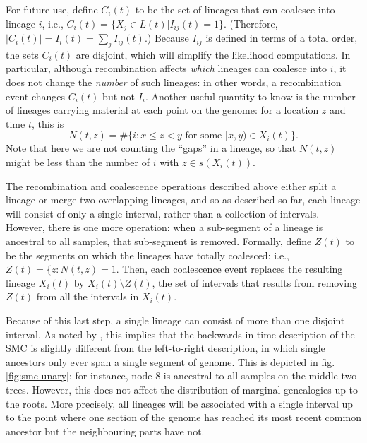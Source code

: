 \documentclass{article}
\begin{document}
For future use, define $C_i(t)$ to be the set of lineages that can coalesce into lineage $i$,
i.e., $C_i(t) = \{X_j \in L(t) | I_{ij}(t) = 1\}$.
(Therefore, $|C_i(t)| = I_{i}(t) = \sum_{j} I_{ij}(t)$.)
Because $I_{ij}$ is defined in terms of a total order, the sets $C_i(t)$ are disjoint,
which will simplify the likelihood computations.
In particular,
although recombination affects \emph{which} lineages can coalesce into $i$,
it does not change the \emph{number} of such lineages:
in other words, a recombination event changes $C_i(t)$ but not $I_{i}$.
Another useful quantity to know is the number of lineages carrying material
at each point on the genome:
for a location $z$ and time $t$, this is
\begin{equation}
    N(t,z) = \#\{i : x \le z < y \text{ for some } [x,y) \in X_i(t) \} .
\end{equation}
Note that here we are not counting the ``gaps'' in a lineage,
so that $N(t, z)$ might be less than the number of $i$ with $z \in s(X_i(t))$.

The recombination and coalescence operations described above
either split a lineage or merge two overlapping lineages,
and so as described so far, each lineage will consist of only a single interval,
rather than a collection of intervals.
However, there is one more operation:
when a sub-segment of a lineage is ancestral to all samples,
that sub-segment is removed.
Formally, define $Z(t)$ to be the segments on which the lineages have totally coalesced:
i.e., $Z(t) = \{z : N(t,z) = 1$.
Then, each coalescence event replaces the resulting lineage $X_i(t)$
by $X_i(t) \setminus Z(t)$,
the set of intervals that results from removing $Z(t)$ from all the intervals in $X_i(t)$.

Because of this last step, a single lineage can consist of more than one disjoint interval.
As noted by \cite{mcvean_approximating_2005},
this implies that the backwards-in-time description of the
SMC is slightly different from the left-to-right description,
in which single ancestors only ever span a single segment of genome.
This is depicted in fig.\ref{fig:smc-unary}:
for instance, node 8 is ancestral to all samples on the middle two trees.
However, this does not affect the distribution
of marginal genealogies up to the roots.
More precisely, all lineages will be associated with
a single interval up to the point where one section of the
genome has reached its most recent common ancestor but the neighbouring parts have not.
\end{document}
